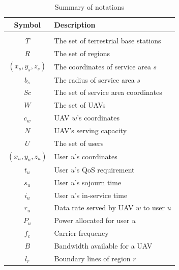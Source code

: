 \documentclass[a4paper,12pt]{report}
\begin{document}
\begin{table} [h!]
    \centering
    \caption{Summary of notations}
    \label{table:Summary of Notation}
    \begin{tabularx}{\linewidth}{c X}
    \toprule
    \textbf{Symbol} & \textbf{Description}\\
    \midrule
    \\ [-2em]
    $T$                             & The set of terrestrial base stations                     \\ [0.5ex]
    $R$                             & The set of regions                                       \\ [0.5ex]
    $(x_{s},y_{s},z_{s})$           & The coordinates of service area $s$                      \\ [0.5ex]
    $b_{s}$                         & The radius of service area $s$                           \\ [0.5ex]
    $Sc$                            & The set of service area coordinates                      \\ [0.5ex]
    $W$                             & The set of UAVs                                          \\ [0.5ex]
    $c_w$                           & UAV $w$'s coordinates                                    \\ [0.5ex]
    $N$                             & UAV's serving capacity                                   \\ [0.5ex]
    $U$                             & The set of users                                         \\ [0.5ex]
    $(x_{u},y_{u},z_{u})$           & User $u$'s coordinates                                   \\ [0.5ex]
    $t_u$                           & User $u$'s QoS requirement                               \\ [0.5ex]
    $s_u$                           & User $u$'s sojourn time                                  \\ [0.5ex]
    $i_u$                           & User $u$'s in-service time                               \\ [0.5ex]
    $r_{u}$                         & Data rate served by UAV $w$ to user $u$                  \\ [0.5ex]
    $P_u$                           & Power allocated for user $u$                             \\ [0.5ex]
    $f_c$                           & Carrier frequency                                        \\ [0.5ex]
    $B$                             & Bandwidth available for a UAV                            \\ [0.5ex]
    $l_r$                           & Boundary lines of region $r$                             \\ [0.5ex]
    \bottomrule
    \end{tabularx}
\end{table}
\end{document}

